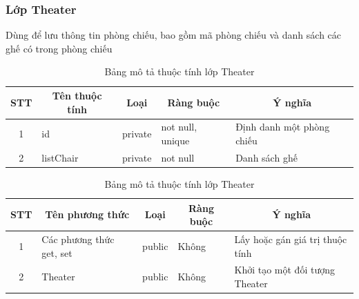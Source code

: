 \documentclass[a4paper, 12pt]{article}
\begin{document}
\subsubsection{Lớp Theater}
Dùng để lưu thông tin phòng chiếu, bao gồm mã phòng chiếu và danh sách các ghế có trong phòng chiếu 
\begin{table}[H]
	\begin{center}
		\begin{tabular}{|c|l|c|l|l|}
			\hline
			STT & \multicolumn{1}{c|}{Tên thuộc tính} & Loại                         & \multicolumn{1}{c|}{Ràng buộc} & \multicolumn{1}{c|}{Ý nghĩa} \\ \hline
			1   & id                                  & private                      & not null, unique               & Định danh một phòng chiếu    \\ \hline
			2   & listChair                           & \multicolumn{1}{l|}{private} & not null                       & Danh sách ghế                \\ \hline
			\end{tabular}
			\caption{Bảng mô tả thuộc tính lớp Theater}
	\end{center}
\end{table}

\begin{table}[H]
	\begin{center}
		\begin{tabular}{|c|l|c|l|l|}
			\hline
			STT & \multicolumn{1}{c|}{Tên phương thức} & Loại                        & \multicolumn{1}{c|}{Ràng buộc} & \multicolumn{1}{c|}{Ý nghĩa}    \\ \hline
			1   & Các phương thức get, set             & public                      &              Không                  & Lấy hoặc gán giá trị thuộc tính \\ \hline
			2   & Theater                              & \multicolumn{1}{l|}{public} &                   Không             & Khởi tạo một đối tượng Theater  \\ \hline
			\end{tabular}
			\caption{Bảng mô tả thuộc tính lớp Theater}
	\end{center}
\end{table}
\end{document}
